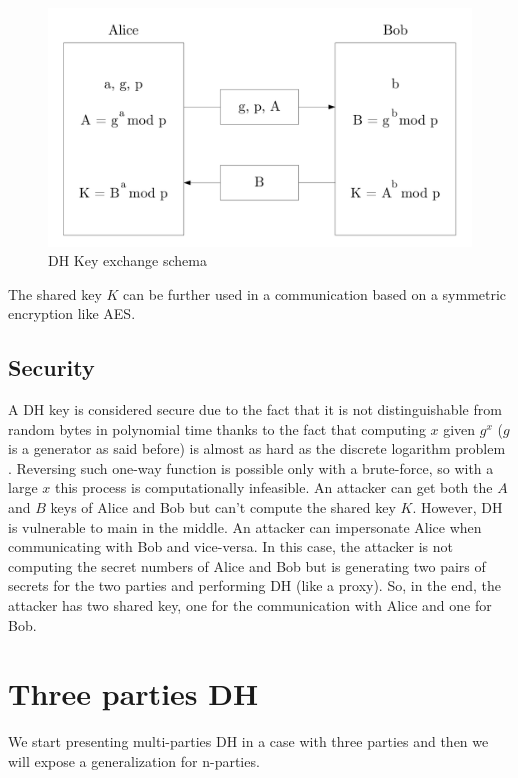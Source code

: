 \documentclass[11pt]{article}
\begin{document}
\begin{figure}[!ht]
    \centering
    \includegraphics[width=1\textwidth]{dhimg-hw4-1692419}
    \caption{DH Key exchange schema}
    \label{fig:dhimg}
\end{figure}

The shared key $K$ can be further used in a communication based on a symmetric encryption like AES. 

\subsection{Security}

A DH key is considered secure due to the fact that it is not distinguishable from random bytes in polynomial time thanks to the fact that computing $x$ given $g^x$ ($g$ is a generator as said before) is almost as hard as the discrete logarithm problem \cite{discrete}.
Reversing such one-way function is possible only with a brute-force, so with a large $x$ this process is computationally infeasible. An attacker can get both the $A$ and $B$ keys of Alice and Bob but can't compute the shared key $K$.
However, DH is vulnerable to main in the middle. An attacker can impersonate Alice when communicating with Bob and vice-versa. In this case, the attacker is not computing the secret numbers of Alice and Bob but is generating two pairs of secrets for the two parties and performing DH (like a proxy). So, in the end, the attacker has two shared key, one for the communication with Alice and one for Bob.

\section{Three parties DH}

We start presenting multi-parties DH in a case with three parties and then we will expose a generalization for n-parties.
\end{document}
